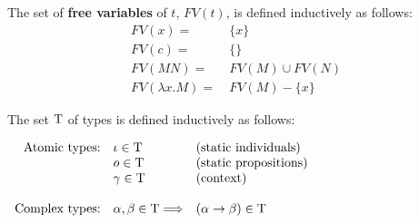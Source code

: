\begin{definition} The set of \textbf{free variables} of $t$, $FV(t)$, is defined inductively as follows:
\begin{align*}
FV(x) = \ &  \{ x \} \\
FV(c) = \ & \{ \} \\
FV(M N) = \ & FV(M) \cup FV(N)  \\
FV( \lambda x. M) = \ & FV(M) - \{ x \}
\end{align*}
\end{definition}

\begin{definition}[Types]
The set $\text{T}$ of types is defined inductively as follows:
\begin{center} $
\begin{array}{rll}
\text{Atomic types:} & \iota \in \text{T} & \text{(static individuals)} \\
 & o \in \text{T} &  \text{(static propositions)} \\
&  \gamma \in \text{T} &  \text{(context)} \\\\
 \text{Complex types:} & \alpha, \beta \in \text{T} \Longrightarrow & (\alpha \rightarrow \beta) \in \text{T} \\
\end{array} 
$ \end{center}
\label{def:types-FO}
\end{definition}

